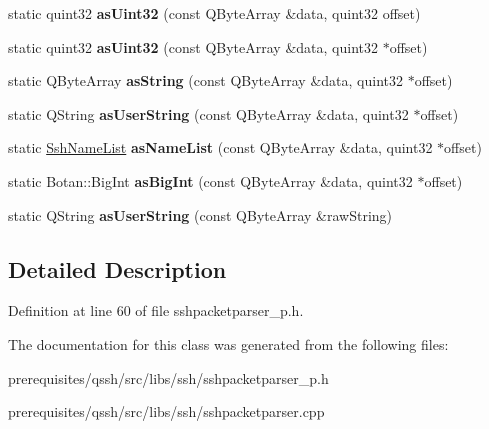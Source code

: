 \begin{DoxyCompactItemize}
\item 
\mbox{\label{class_q_ssh_1_1_internal_1_1_ssh_packet_parser_a9934b5c9d6c399093a1878df37c70f87}} 
static quint32 {\bfseries as\+Uint32} (const Q\+Byte\+Array \&data, quint32 offset)
\item 
\mbox{\label{class_q_ssh_1_1_internal_1_1_ssh_packet_parser_ab8eaf4cd551f58628061a109dd5140f8}} 
static quint32 {\bfseries as\+Uint32} (const Q\+Byte\+Array \&data, quint32 $\ast$offset)
\item 
\mbox{\label{class_q_ssh_1_1_internal_1_1_ssh_packet_parser_a5b339def63ab98df18279503607c22c0}} 
static Q\+Byte\+Array {\bfseries as\+String} (const Q\+Byte\+Array \&data, quint32 $\ast$offset)
\item 
\mbox{\label{class_q_ssh_1_1_internal_1_1_ssh_packet_parser_a998347cff636eb3bc672fe16f17879d7}} 
static Q\+String {\bfseries as\+User\+String} (const Q\+Byte\+Array \&data, quint32 $\ast$offset)
\item 
\mbox{\label{class_q_ssh_1_1_internal_1_1_ssh_packet_parser_a40b2f34b8247d02918d3350fc7234d8d}} 
static \mbox{\hyperlink{struct_q_ssh_1_1_internal_1_1_ssh_name_list}{Ssh\+Name\+List}} {\bfseries as\+Name\+List} (const Q\+Byte\+Array \&data, quint32 $\ast$offset)
\item 
\mbox{\label{class_q_ssh_1_1_internal_1_1_ssh_packet_parser_aa35d9d7f39588f7fb7b91ea6d405b895}} 
static Botan\+::\+Big\+Int {\bfseries as\+Big\+Int} (const Q\+Byte\+Array \&data, quint32 $\ast$offset)
\item 
\mbox{\label{class_q_ssh_1_1_internal_1_1_ssh_packet_parser_a545c5ab170dad695bb48db633e888cf7}} 
static Q\+String {\bfseries as\+User\+String} (const Q\+Byte\+Array \&raw\+String)
\end{DoxyCompactItemize}


\subsection{Detailed Description}


Definition at line 60 of file sshpacketparser\+\_\+p.\+h.



The documentation for this class was generated from the following files\+:\begin{DoxyCompactItemize}
\item 
prerequisites/qssh/src/libs/ssh/sshpacketparser\+\_\+p.\+h\item 
prerequisites/qssh/src/libs/ssh/sshpacketparser.\+cpp\end{DoxyCompactItemize}
